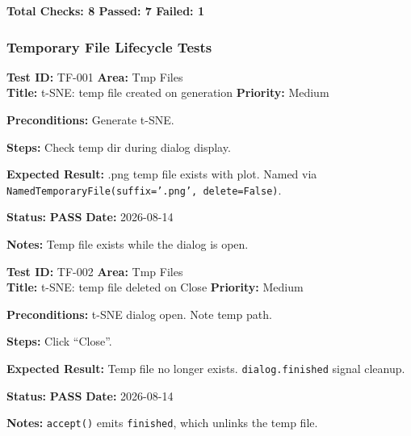 \documentclass[12pt,a4paper]{article}
\newcommand{\pass}{\textcolor{paleogreen}{\textbf{PASS}}}
\newcommand{\testheader}[4]{%
  \smallskip
  \noindent\textbf{Test ID:} #1 \hfill \textbf{Area:} #2 \\
  \textbf{Title:} #3 \hfill \textbf{Priority:} #4
}
\newenvironment{testbody}{%
  \begin{description}[leftmargin=2em,style=nextline]
}{%
  \end{description}
  \smallskip
}
\begin{document}
\begin{center}
\large\textbf{Total Checks: 8 \hspace{1em} Passed: 7 \hspace{1em} Failed: 1}
\end{center}

\newpage

\subsubsection{Temporary File Lifecycle Tests}

\testheader{TF-001}{Tmp Files}{t-SNE: temp file created on generation}{Medium}
\begin{testbody}
  \item[\textbf{Preconditions:}] Generate t-SNE.
  \item[\textbf{Steps:}] Check temp dir during dialog display.
  \item[\textbf{Expected Result:}] .png temp file exists with plot. Named via
        \texttt{NamedTemporaryFile(suffix='.png', delete=False)}.
  \item[\textbf{Status:}] \pass{} \hspace{1em} \textbf{Date:} 2026-08-14
  \item[\textbf{Notes:}] Temp file exists while the dialog is open.
\end{testbody}

\testheader{TF-002}{Tmp Files}{t-SNE: temp file deleted on Close}{Medium}
\begin{testbody}
  \item[\textbf{Preconditions:}] t-SNE dialog open. Note temp path.
  \item[\textbf{Steps:}] Click ``Close''.
  \item[\textbf{Expected Result:}] Temp file no longer exists.
        \texttt{dialog.finished} signal cleanup.
  \item[\textbf{Status:}] \pass{} \hspace{1em} \textbf{Date:} 2026-08-14
  \item[\textbf{Notes:}] \texttt{accept()} emits \texttt{finished}, which
        unlinks the temp file.
\end{testbody}
\end{document}
